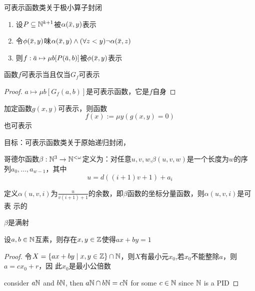 \documentclass[11pt]{article}
\begin{document}
\begin{lemma}[]
可表示函数类关于极小算子封闭
\begin{enumerate}
\item 设\(P\subseteq\mathbb{N}^{k+1}\)被\(\alpha(\barx,y)\)表示
\item 令\(\phi(\barx,y)\)味\(\alpha(\barx,y)\wedge(\forall z<y)\neg\alpha(\barx,z)\)
\item 则\(f:\bara\mapsto\mu b[P(\bara,b)]\)被\(\phi(\barx,y)\)表示
\end{enumerate}
\end{lemma}

\begin{corollary}[]
函数\(f\)可表示当且仅当\(G_f\)可表示
\end{corollary}

\begin{proof}
\(a\mapsto\mu b[G_f(a,b)]\)是可表示函数，它是\(f\)自身
\end{proof}

\begin{corollary}[]
加定函数\(g(x,y)\)可表示，则函数
\begin{equation*}
f(x):=\mu y(g(x,y)=0)
\end{equation*}
也可表示
\end{corollary}

目标：可表示函数类关于原始递归封闭，


\begin{definition}[]
哥德尔函数\(\beta:\mathbb{N}^3\to\mathbb{N}^{<\omega}\)定义为：对任意\(u,v,w\),\(\beta(u,v,w)\)是一个长度为\(w\)的序
列\(a_0,\dots,a_{w-1}\)，其中
\begin{equation*}
u=d((i+1)v+1)+a_i
\end{equation*}
\end{definition}

定义\(\alpha(u,v,i)\)为\(\frac{u}{v(i+1)+1}\)的余数，即\(\beta\)函数的坐标分量函数，则\(\alpha(u,v,i)\)是可表
示的

\begin{theorem}[]
\(\beta\)是满射
\end{theorem}

\begin{lemma}[欧几里得引理]
设\(a,b\in\mathbb{N}\)互素，则存在\(x,y\in\mathbb{Z}\)使得\(ax+by=1\)
\end{lemma}

\begin{proof}
令\(X=\{ax+by\mid x,y\in\mathbb{Z}\}\cap\mathbb{N}\)，则\(X\)有最小元\(x_0\),若\(x_0\)不能整除\(a\)，则\(a=cx_0+r\)，因
此\(x_0\)是最小公倍数

consider \(a\mathbb{N}\) and \(b\mathbb{N}\), then \(a\mathbb{N}\cap b\mathbb{N}=c\mathbb{N}\) for some \(c\in\mathbb{N}\) since \(\mathbb{N}\) is a PID
\end{proof}
\end{document}
